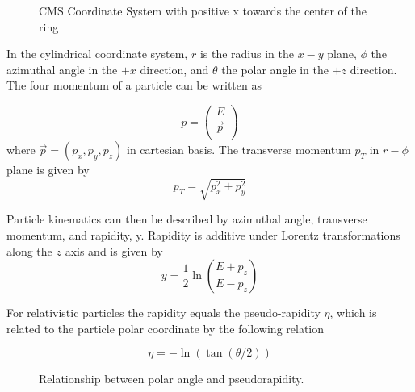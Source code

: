 \begin{figure}[htbp!]
\centering
{}
\caption{CMS Coordinate System with positive x towards the center of the ring} \label{fig:CMS:Coordinate}
\end{figure}


In the cylindrical coordinate system,  $r$ is the radius in the $x-y$ plane, $\phi$ the azimuthal
angle in the $+x$ direction, and $\theta$ the polar angle in the $+z$ direction. The four momentum of a particle can be written as

$$
p =   \begin{pmatrix}
    E\\
    \vec{p}\\
  \end{pmatrix}
$$
where $\vec{p} = (p_{x}, p_{y}, p_{z})$ in cartesian basis. The transverse momentum $p_{T}$ in $r - \phi $ plane is given by
$$
p_{T} = \sqrt{p_{x}^{2} + p_{y}^{2}}
$$

Particle kinematics can then be described by azimuthal angle, transverse momentum, and rapidity, y. Rapidity is additive under Lorentz transformations along the $z$ axis and is given by
$$
y = \frac{1}{2} \ln \left( \frac{E+p_{z}}{E-p_{z}} \right)
$$

For relativistic particles the rapidity equals the pseudo-rapidity $\eta$, which is related to the particle polar coordinate by the following relation

$$
\eta = -\ln(\tan(\theta/2))
$$


\begin{figure}
\centering
{}
	\caption{Relationship between polar angle and pseudorapidity.}
\end{figure}


